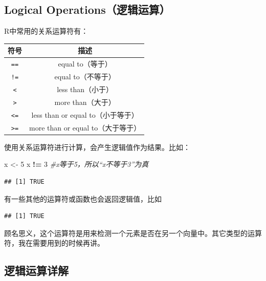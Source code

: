 \documentclass[]{book}
\newenvironment{Shaded}{\begin{snugshade}}{\end{snugshade}}
\newcommand{\CommentTok}[1]{\textcolor[rgb]{0.56,0.35,0.01}{\textit{#1}}}
\newcommand{\DecValTok}[1]{\textcolor[rgb]{0.00,0.00,0.81}{#1}}
\newcommand{\KeywordTok}[1]{\textcolor[rgb]{0.13,0.29,0.53}{\textbf{#1}}}
\newcommand{\NormalTok}[1]{#1}
\newcommand{\OperatorTok}[1]{\textcolor[rgb]{0.81,0.36,0.00}{\textbf{#1}}}
\newcommand{\StringTok}[1]{\textcolor[rgb]{0.31,0.60,0.02}{#1}}
\begin{document}
\hypertarget{logical-operations}{%
\subsection{Logical Operations（逻辑运算）}\label{logical-operations}}

R中常用的关系运算符有：

\begin{longtable}[]{@{}cc@{}}
\toprule
符号 & 描述\tabularnewline
\midrule
\endhead
\texttt{==} & equal to（等于）\tabularnewline
\texttt{!=} & equal to（不等于）\tabularnewline
\texttt{\textless{}} & less than（小于）\tabularnewline
\texttt{\textgreater{}} & more than（大于）\tabularnewline
\texttt{\textless{}=} & less than or equal to（小于等于）\tabularnewline
\texttt{\textgreater{}=} & more than or equal to（大于等于）\tabularnewline
\bottomrule
\end{longtable}

使用关系运算符进行计算，会产生逻辑值作为结果。比如：

\begin{Shaded}
\begin{Highlighting}[]
\NormalTok{x <-}\StringTok{ }\DecValTok{5}
\NormalTok{x }\OperatorTok{!=}\StringTok{ }\DecValTok{3} \CommentTok{#x等于5，所以“x不等于3”为真}
\end{Highlighting}
\end{Shaded}

\begin{verbatim}
## [1] TRUE
\end{verbatim}

有一些其他的运算符或函数也会返回逻辑值，比如

\begin{Shaded}
\end{Shaded}

\begin{verbatim}
## [1] TRUE
\end{verbatim}

顾名思义，这个运算符是用来检测一个元素是否在另一个向量中。其它类型的运算符，我在需要用到的时候再讲。

\subsection{逻辑运算详解}
\end{document}
